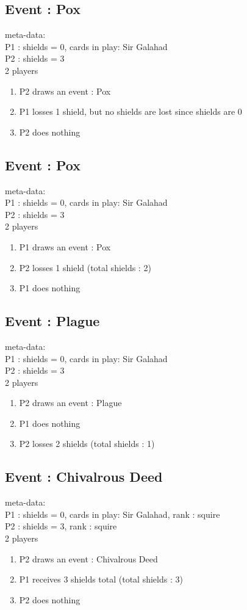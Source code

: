 \documentclass[a4paper,11pt]{article}
\begin{document}
\subsection{Event : Pox}
meta-data:\\
P1 : shields = 0, cards in play: Sir Galahad\\
P2 : shields = 3\\
2 players\\
\begin{enumerate}
	\item P2 draws an event : Pox
	\item P1 losses 1 shield, but no shields are lost since shields are 0
	\item P2 does nothing
\end{enumerate}


\subsection{Event : Pox}
meta-data:\\
P1 : shields = 0, cards in play: Sir Galahad\\
P2 : shields = 3\\
2 players\\
\begin{enumerate}
	\item P1 draws an event : Pox
	\item P2 losses 1 shield (total shields : 2)
	\item P1 does nothing
\end{enumerate}


\subsection{Event : Plague}
meta-data:\\
P1 : shields = 0, cards in play: Sir Galahad\\
P2 : shields = 3\\
2 players\\
\begin{enumerate}
	\item P2 draws an event : Plague 
	\item P1 does nothing
	\item P2 losses 2 shields (total shields : 1)
\end{enumerate}


\subsection{Event : Chivalrous Deed}
meta-data:\\
P1 : shields = 0, cards in play: Sir Galahad, rank : squire\\
P2 : shields = 3, rank : squire \\
2 players\\
\begin{enumerate}
	\item P2 draws an event : Chivalrous Deed
	\item P1 receives 3 shields total (total shields : 3)
	\item P2 does nothing
\end{enumerate}
\end{document}
